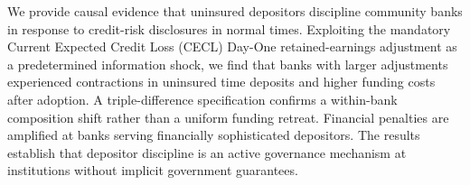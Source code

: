 
We provide causal evidence that uninsured depositors discipline community banks
in response to credit-risk disclosures in normal times.  Exploiting the mandatory Current Expected Credit Loss (CECL) Day-One
retained-earnings adjustment as a predetermined information shock,
we find that banks with larger adjustments experienced contractions in uninsured
time deposits and higher funding costs after adoption.  A triple-difference specification confirms a within-bank composition
shift rather than a uniform funding retreat.  Financial penalties are amplified
at banks serving financially sophisticated depositors.  The results establish
that depositor discipline is an active governance mechanism at institutions
without implicit government guarantees.
